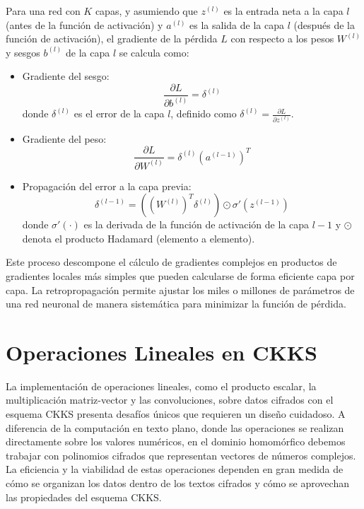 Para una red con $K$ capas, y asumiendo que $z^{(l)}$ es la entrada neta a la capa $l$ (antes de la función de activación) y $a^{(l)}$ es la salida de la capa $l$ (después de la función de activación), el gradiente de la pérdida $L$ con respecto a los pesos $W^{(l)}$ y sesgos $b^{(l)}$ de la capa $l$ se calcula como:

\begin{itemize}
    \item Gradiente del sesgo:
    \begin{equation}
    \frac{\partial L}{\partial b^{(l)}} = \delta^{(l)}
    \end{equation}
    donde $\delta^{(l)}$ es el error de la capa $l$, definido como $\delta^{(l)} = \frac{\partial L}{\partial z^{(l)}}$.
    \item Gradiente del peso:
    \begin{equation}
    \frac{\partial L}{\partial W^{(l)}} = \delta^{(l)} (a^{(l-1)})^T
    \end{equation}
    \item Propagación del error a la capa previa:
    \begin{equation}
    \delta^{(l-1)} = ((W^{(l)})^T \delta^{(l)}) \odot \sigma'(z^{(l-1)})
    \end{equation}
    donde $\sigma'(\cdot)$ es la derivada de la función de activación de la capa $l-1$ y $\odot$ denota el producto Hadamard (elemento a elemento).
\end{itemize}
Este proceso descompone el cálculo de gradientes complejos en productos de gradientes locales más simples que pueden calcularse de forma eficiente capa por capa. La retropropagación permite ajustar los miles o millones de parámetros de una red neuronal de manera sistemática para minimizar la función de pérdida.

\section{Operaciones Lineales en CKKS}

La implementación de operaciones lineales, como el producto escalar, la multiplicación matriz-vector y las convoluciones, sobre datos cifrados con el esquema CKKS \cite{CKKS17} presenta desafíos únicos que requieren un diseño cuidadoso. A diferencia de la computación en texto plano, donde las operaciones se realizan directamente sobre los valores numéricos, en el dominio homomórfico debemos trabajar con polinomios cifrados que representan vectores de números complejos. La eficiencia y la viabilidad de estas operaciones dependen en gran medida de cómo se organizan los datos dentro de los textos cifrados y cómo se aprovechan las propiedades del esquema CKKS.

